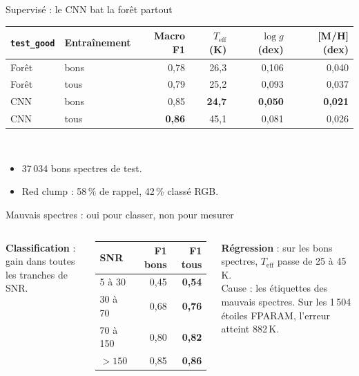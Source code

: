 \documentclass[aspectratio=169,11pt]{beamer}
\newcommand{\teff}{$T_{\mathrm{eff}}$}
\begin{document}
\begin{frame}{Supervisé : le CNN bat la forêt partout}
\centering
\begin{tabular}{llrrrr}
\toprule
\texttt{test\_good} & Entraînement & Macro F1 & \teff{} (K) & $\log g$ (dex) & [M/H] (dex) \\
\midrule
Forêt & bons & 0,78 & 26,3 & 0,106 & 0,040 \\
Forêt & tous & 0,79 & 25,2 & 0,093 & 0,037 \\
CNN & bons & 0,85 & \textbf{24,7} & \textbf{0,050} & \textbf{0,021} \\
CNN & tous & \textbf{0,86} & 45,1 & 0,081 & 0,026 \\
\bottomrule
\end{tabular}\\[1.2em]
\raggedright
\begin{itemize}
  \item 37\,034 bons spectres de test.
  \item Red clump : 58\,\% de rappel, 42\,\% classé RGB.
\end{itemize}
\end{frame}

\begin{frame}{Mauvais spectres : oui pour classer, non pour mesurer}
\begin{columns}[c]
\textbf{Classification} : gain dans toutes les tranches de SNR.\\[0.5em]
\small
\begin{tabular}{lrr}
\toprule
SNR & F1 bons & F1 tous \\
\midrule
5 à 30 & 0,45 & \textbf{0,54} \\
30 à 70 & 0,68 & \textbf{0,76} \\
70 à 150 & 0,80 & \textbf{0,82} \\
$> 150$ & 0,85 & \textbf{0,86} \\
\bottomrule
\end{tabular}
\textbf{Régression} : sur les bons spectres, \teff{} passe de 25 à \alert{45\,K}.\\[0.8em]
Cause : les étiquettes des mauvais spectres. Sur les 1\,504 étoiles FPARAM, l'erreur atteint \alert{882\,K}.
\end{columns}
\end{frame}
\end{document}
